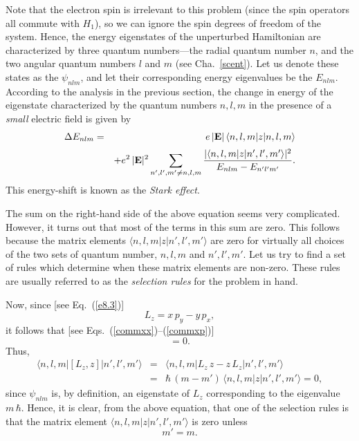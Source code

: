  Note that the electron spin is irrelevant to this problem 
(since the spin operators all commute with $H_1$), so we can ignore
the spin degrees of freedom of the system. Hence, the energy eigenstates
of the unperturbed Hamiltonian are characterized by three quantum
numbers---the radial quantum number $n$, and the two angular
quantum numbers $l$ and $m$ (see Cha.~\ref{scent}). Let us
denote these states as the $\psi_{nlm}$, and let their corresponding energy eigenvalues
be the $E_{nlm}$. According to the analysis in the previous section,  the change in energy of the eigenstate characterized by the quantum
numbers $n,l,m$ in  the presence of a {\em small}\/ electric field is given by
\begin{eqnarray}
\Delta E_{nlm}&=& e\,|{\bf E}|\,\langle n,l,m|z|n,l,m\rangle\nonumber\\[0.5ex]
&&+ e^2\,|{\bf E}|^2\sum_{n',l',m'\neq n,l,m}\frac{|\langle n,l,m|z|n',l',m'\rangle|^2}{E_{nlm}-E_{n'l'm'}}.\label{e12.59}
\end{eqnarray}
This energy-shift is known as the {\em Stark effect}.

The sum on the right-hand side of the above equation seems very complicated. However, it turns out that most of the terms in this sum
are zero. This follows because the matrix elements $\langle n,l,m|z|n',l',m'\rangle$
are zero for virtually all choices of the two sets of quantum number, $n,l,m$ and
$n',l',m'$. Let us try to find a set of rules which determine when these
matrix elements are non-zero. These rules are usually referred to as the
{\em selection rules}\/ for the problem in hand.

Now, since [see Eq.~(\ref{e8.3})]
\begin{equation}
L_z = x\,p_y - y\,p_x,
\end{equation}
it follows that [see Eqs.~(\ref{commxx})--(\ref{commxp})]
\begin{equation}
[L_z,z] = 0.
\end{equation}
Thus,
\begin{eqnarray}
\langle n,l,m|[L_z,z]|n',l',m'\rangle& =& \langle n,l,m|L_z\,z-z\,L_z|n',l',m'\rangle\nonumber\\[0.5ex]
&=& \hbar\,(m-m')\,\langle n,l,m|z|n',l',m'\rangle = 0,
\end{eqnarray}
since $\psi_{nlm}$ is, by definition, an eigenstate of $L_z$ corresponding
to the eigenvalue $m\,\hbar$. Hence, it is clear, from the above equation, 
that one of the selection rules is that the matrix element $\langle n,l,m|z|n',l',m'\rangle$ is zero unless
\begin{equation}\label{e12.63}
m' = m.
\end{equation}

